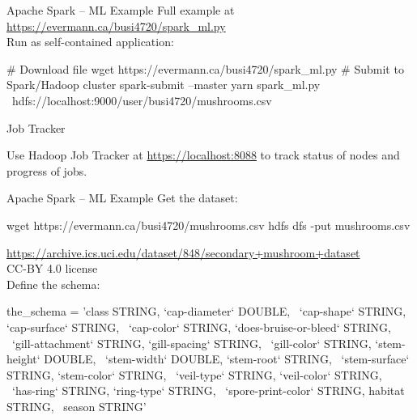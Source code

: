\documentclass[ignorenonframetext,xcolor=x11names]{beamer}
\begin{document}



\begin{frame}[fragile]{Apache Spark -- ML Example}
Full example at \small\url{https://evermann.ca/busi4720/spark_ml.py}\normalsize \\

Run as self-contained application:
\begin{bashcode}
# Download file
wget https://evermann.ca/busi4720/spark_ml.py
# Submit to Spark/Hadoop cluster
spark-submit --master yarn spark_ml.py \
    hdfs://localhost:9000/user/busi4720/mushrooms.csv
\end{bashcode}

\begin{block}{Job Tracker}
\begin{center}
Use Hadoop Job Tracker at \url{https://localhost:8088} to track status of nodes and progress of jobs.
\end{center}
\end{block}
\end{frame}

\begin{frame}[fragile]{Apache Spark -- ML Example}
Get the dataset:
\begin{bashcode}
wget https://evermann.ca/busi4720/mushrooms.csv
hdfs dfs -put mushrooms.csv
\end{bashcode}
\tiny \url{https://archive.ics.uci.edu/dataset/848/secondary+mushroom+dataset} \\ CC-BY 4.0 license \\

\normalsize Define the schema:
\begin{pythoncode}
the_schema = 'class STRING, `cap-diameter` DOUBLE, \
    `cap-shape` STRING, `cap-surface` STRING, \
    `cap-color` STRING, `does-bruise-or-bleed` STRING, \
    `gill-attachment` STRING, `gill-spacing` STRING, \
    `gill-color` STRING, `stem-height` DOUBLE, \
    `stem-width` DOUBLE, `stem-root` STRING, \
    `stem-surface` STRING, `stem-color` STRING, \
    `veil-type` STRING, `veil-color` STRING, \
    `has-ring` STRING, `ring-type` STRING, \
    `spore-print-color` STRING, habitat STRING, \
    season STRING'
\end{pythoncode}
\end{frame}
\end{document}

